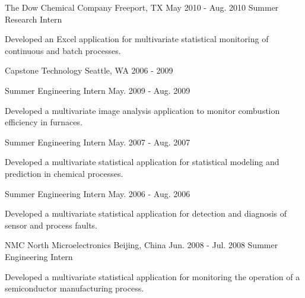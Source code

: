 

\begin{cventries}
\cventry
{The Dow Chemical Company} %
{Freeport, TX} %
{May 2010 - Aug. 2010} %
{Summer Research Intern} %
{
\begin{cvitems} %
\item {Developed an Excel application for multivariate statistical monitoring of continuous and batch processes.}
\end{cvitems}
}%
\cvmultientry
{Capstone Technology} %
{Seattle, WA}
{2006 - 2009} %
{
\cvsubentry
{Summer Engineering Intern} %
{} %
{May. 2009 - Aug. 2009} %
{
\begin{cvitems} %
\item {Developed a multivariate image analysis application to monitor combustion efficiency in furnaces.}
\end{cvitems}
}%
\cvsubentry
{Summer Engineering Intern} %
{} %
{May. 2007 - Aug. 2007} %
{
\begin{cvitems} %
\item {Developed a multivariate statistical application for statistical modeling and prediction in chemical processes.}
\end{cvitems}
}%
\cvsubentry
{Summer Engineering Intern} %
{} %
{May. 2006 - Aug. 2006} %
{
\begin{cvitems} %
\item {Developed a multivariate statistical application for detection and diagnosis of sensor and process faults.}
\end{cvitems}
}
}

\cventry
{NMC North Microelectronics} %
{Beijing, China} %
{Jun. 2008 - Jul. 2008} %
{Summer Engineering Intern} %
{
\begin{cvitems} %
\item {Developed a multivariate statistical application for monitoring the operation of a semiconductor manufacturing process.}
\end{cvitems}
}
\end{cventries}

